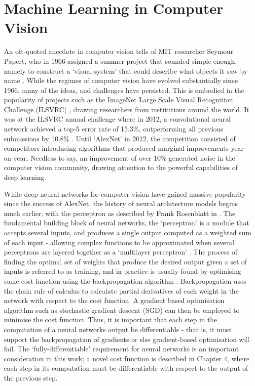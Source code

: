 \section{Machine Learning in Computer Vision}


An oft-quoted anecdote in computer vision tells of MIT researcher Seymour Papert, who in 1966 assigned a summer project that sounded simple enough, namely to construct a `visual system' that could describe what objects it saw by name \cite{papert1966vision}. While the regimes of computer vision have evolved substantially since 1966, many of the ideas, and challenges have persisted. This is embodied in the popularity of projects such as the ImageNet Large Scale Visual Recognition Challenge (ILSVRC) \cite{ilsvrc}, drawing researchers from institutions around the world. It was at the ILSVRC annual challenge where in 2012, a convolutional neural network achieved a top-5 error rate of 15.3\%, outperforming all previous submissions by 10.8\% \cite{krizhevsky2012alexnet}. Until `AlexNet' in 2012, the competition consisted of competitors introducing algorithms that produced marginal improvements year on year. Needless to say, an improvement of over 10\% generated noise in the computer vision community, drawing attention to the powerful capabilities of deep learning.

While deep neural networks for computer vision have gained massive popularity since the success of AlexNet, the history of neural architecture models begins much earlier, with the perceptron as described by Frank Rosenblatt in \cite{rosenblatt1959neurodynamics}. The fundamental building block of neural networks, the `perceptron' is a module that accepts several inputs, and produces a single output computed as a weighted sum of each input - allowing complex functions to be approximated when several perceptrons are layered together as a `multilayer perceptron' \cite{minsky1969perceptrons}. The process of finding the optimal set of weights that produce the desired output given a set of inputs is referred to as training, and in practice is usually found by optimising some cost function using the backpropagation algorithm \cite{rumelhart1986backprop}. Backpropagation uses the chain rule of calculus to calculate partial derivatives of each weight in the network with respect to the cost function. A gradient based optimisation algorithm such as stochastic gradient descent (SGD) can then be employed to minimise the cost function. Thus, it is important that each step in the computation of a neural networks output be differentiable - that is, it must support the backpropagation of gradients or else gradient-based optimisation will fail. The `fully-differentiable' requirement for neural networks is an important consideration in this work; a novel cost function is described in Chapter 4, where each step in its computation must be differentiable with respect to the output of the previous step. 

